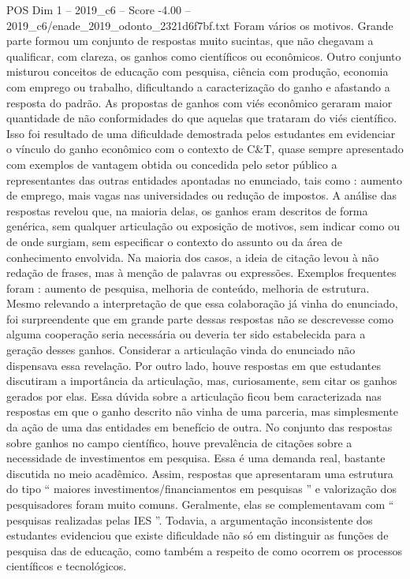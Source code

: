 \begin{textsample}{POS Dim 1 – 2019\_c6 – Score -4.00 – 2019\_c6/enade\_2019\_odonto\_2321d6f7bf.txt}
Foram vários os motivos.
Grande parte formou um conjunto de respostas muito sucintas, que não chegavam a qualificar, com clareza, os ganhos como científicos ou econômicos.
Outro conjunto misturou conceitos de educação com pesquisa, ciência com produção, economia com emprego ou trabalho, dificultando a caracterização do ganho e afastando a resposta do padrão.
As propostas de ganhos com viés econômico geraram maior quantidade de não conformidades do que aquelas que trataram do viés científico.
Isso foi resultado de uma dificuldade demostrada pelos estudantes em evidenciar o vínculo do ganho econômico com o contexto de C\&T, quase sempre apresentado com exemplos de vantagem obtida ou concedida pelo setor público a representantes das outras entidades apontadas no enunciado, tais como : aumento de emprego, mais vagas nas universidades ou redução de impostos.
A análise das respostas revelou que, na maioria delas, os ganhos eram descritos de forma genérica, sem qualquer articulação ou exposição de motivos, sem indicar como ou de onde surgiam, sem especificar o contexto do assunto ou da área de conhecimento envolvida.
Na maioria dos casos, a ideia de citação levou à não redação de frases, mas à menção de palavras ou expressões.
Exemplos frequentes foram : aumento de pesquisa, melhoria de conteúdo, melhoria de estrutura.
Mesmo relevando a interpretação de que essa colaboração já vinha do enunciado, foi surpreendente que em grande parte dessas respostas não se descrevesse como alguma cooperação seria necessária ou deveria ter sido estabelecida para a geração desses ganhos.
Considerar a articulação vinda do enunciado não dispensava essa revelação.
Por outro lado, houve respostas em que estudantes discutiram a importância da articulação, mas, curiosamente, sem citar os ganhos gerados por elas.
Essa dúvida sobre a articulação ficou bem caracterizada nas respostas em que o ganho descrito não vinha de uma parceria, mas simplesmente da ação de uma das entidades em benefício de outra.
No conjunto das respostas sobre ganhos no campo científico, houve prevalência de citações sobre a necessidade de investimentos em pesquisa.
Essa é uma demanda real, bastante discutida no meio acadêmico.
Assim, respostas que apresentaram uma estrutura do tipo “ maiores investimentos/financiamentos em pesquisas ” e valorização dos pesquisadores foram muito comuns.
Geralmente, elas se complementavam com “ pesquisas realizadas pelas IES ”.
Todavia, a argumentação inconsistente dos estudantes evidenciou que existe dificuldade não só em distinguir as funções de pesquisa das de educação, como também a respeito de como ocorrem os processos científicos e tecnológicos.

\end{textsample}
